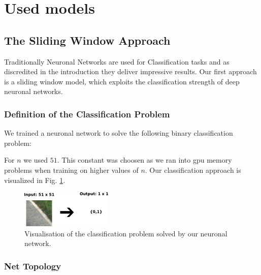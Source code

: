 
\section{Used models}\label{sec:model}

\subsection{The Sliding Window Approach}

Traditionally Neuronal Networks are used for Classification tasks and as discredited in the introduction they deliver impressive results. Our first approach is a sliding window model, which exploits the classification strength of deep neuronal networks.

\subsubsection{Definition of the Classification Problem}

We trained a neuronal network to solve the following binary classification problem:


For $n$ we used $51$. This constant was choosen as we ran into gpu memory problems when training on higher values of $n$. Our classification approach is visualized in Fig. \ref{fig:figure}.

\begin{figure}[H]
	\centering
	\includegraphics[width=0.5\columnwidth]{figures/models/sliding_window.png}
	\caption{Visualisation of the classification problem solved by our neuronal network.}
	\label{fig:figure}
\end{figure} 

\subsubsection{Net Topology}


